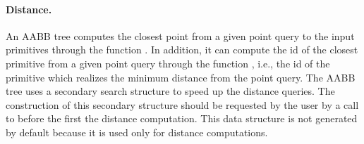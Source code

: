 \paragraph{Distance.} An AABB tree computes the closest point from a given point query to the input primitives through the function . In addition, it can compute the id of the closest primitive from a given point query through the function , i.e., the id of the primitive which realizes the minimum distance from the point query. The AABB tree uses a secondary search structure to speed up the distance queries. The construction of this secondary structure should be requested by the user by a call to  before the first the distance computation. This data structure is not generated by default because it is used only for distance computations.


